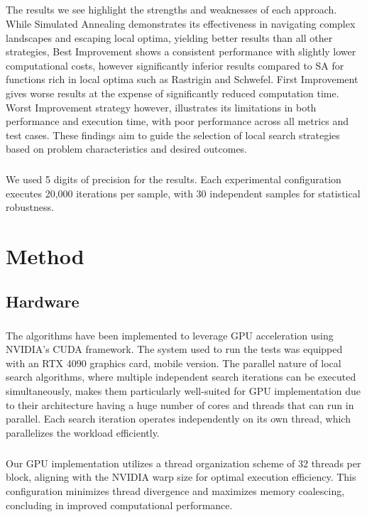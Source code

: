 \documentclass{article}
\begin{document}
\subparagraph{}
The results we see highlight the strengths and weaknesses of each approach. While Simulated Annealing demonstrates its effectiveness in navigating complex landscapes and escaping local optima, yielding better results than all other strategies, Best Improvement shows a consistent performance with slightly lower computational costs, however significantly inferior results compared to SA for functions rich in local optima such as Rastrigin and Schwefel. First Improvement gives worse results at the expense of significantly reduced computation time. Worst Improvement strategy however, illustrates its limitations in both performance and execution time, with poor performance across all metrics and test cases. These findings aim to guide the selection of local search strategies based on problem characteristics and desired outcomes.

\subparagraph{}
We used 5 digits of precision for the results. Each experimental configuration executes 20,000 iterations per sample, with 30 independent samples for statistical robustness.


\section{Method}

\subsection{Hardware}

\subparagraph{}
The algorithms have been implemented to leverage GPU acceleration using NVIDIA's CUDA framework. The system used to run the tests was equipped with an RTX 4090 graphics card, mobile version. The parallel nature of local search algorithms, where multiple independent search iterations can be executed simultaneously, makes them particularly well-suited for GPU implementation due to their architecture having a huge number of cores and threads that can run in parallel. Each search iteration operates independently on its own thread, which parallelizes the workload efficiently.

\subparagraph{}
Our GPU implementation utilizes a thread organization scheme of 32 threads per block, aligning with the NVIDIA warp size for optimal execution efficiency. This configuration minimizes thread divergence and maximizes memory coalescing, concluding in improved computational performance.
\end{document}
